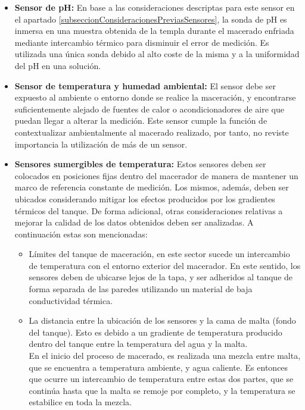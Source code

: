    \begin{itemize}
    
        \item \textbf{Sensor de pH: }En base a las consideraciones descriptas para este sensor en el apartado \ref{subseccionConsideracionesPreviasSensores}, la sonda de pH es inmersa en una muestra obtenida de la templa durante el macerado enfriada mediante intercambio térmico para disminuir el error de medición. Es utilizada una única sonda debido al alto coste de la misma y a la uniformidad del pH en una solución.
        
        \item \textbf{Sensor de temperatura y humedad ambiental: } El sensor debe ser expuesto al ambiente o entorno donde se realice la maceración, y encontrarse suficientemente alejado de fuentes de calor o acondicionadores de aire que puedan llegar a alterar la medición. Este sensor cumple la función de contextualizar ambientalmente al macerado realizado, por tanto, no reviste importancia la utilización de más de un sensor.
        
        \item \textbf{Sensores sumergibles de temperatura: } Estos sensores deben ser colocados en posiciones fijas dentro del macerador de manera de mantener un marco de referencia constante de medición. Los mismos, además, deben ser ubicados considerando mitigar los efectos producidos por los gradientes térmicos del tanque. De forma adicional, otras consideraciones relativas a mejorar la calidad de los datos obtenidos deben ser analizadas. A continuación estas son mencionadas:
        \begin{itemize}
        
            \item Límites del tanque de maceración, en este sector sucede un intercambio de temperatura con el entorno exterior del macerador. En este sentido, los sensores deben de ubicarse lejos de la tapa, y ser adheridos al tanque de forma separada de las paredes utilizando un material de baja conductividad térmica.
            
            \item 
            La distancia entre la ubicación de los sensores y la cama de malta (fondo del tanque). Esto es debido a un gradiente de temperatura producido dentro del tanque entre la temperatura del agua y la malta.\\
            En el inicio del proceso de macerado, es realizada una mezcla entre malta, que se encuentra a temperatura ambiente, y agua caliente. Es entonces que ocurre un intercambio de temperatura entre estas dos partes, que se continúa hasta que la malta se remoje por completo, y la temperatura se estabilice en toda la mezcla.
            

\end{itemize}
\end{itemize}
